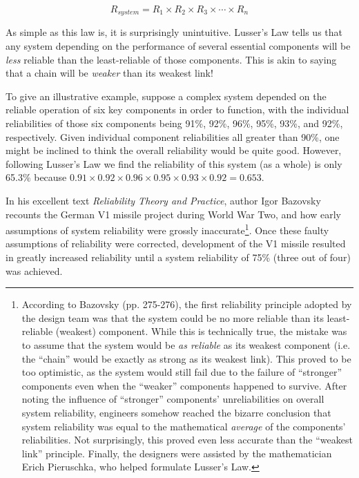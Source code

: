$$R_{system} = R_1 \times R_2 \times R_3 \times \cdots \times R_n$$

As simple as this law is, it is surprisingly unintuitive.  Lusser's Law tells us that any system depending on the performance of several essential components will be \textit{less} reliable than the least-reliable of those components.  This is akin to saying that a chain will be \textit{weaker} than its weakest link!  

To give an illustrative example, suppose a complex system depended on the reliable operation of six key components in order to function, with the individual reliabilities of those six components being 91\%, 92\%, 96\%, 95\%, 93\%, and 92\%, respectively.  Given individual component reliabilities all greater than 90\%, one might be inclined to think the overall reliability would be quite good.  However, following Lusser's Law we find the reliability of this system (as a whole) is only 65.3\% because $0.91 \times 0.92 \times 0.96 \times 0.95 \times 0.93 \times 0.92 = 0.653$.

In his excellent text \textit{Reliability Theory and Practice}, author Igor Bazovsky recounts the German V1 missile project during World War Two, and how early assumptions of system reliability were grossly inaccurate\footnote{According to Bazovsky (pp. 275-276), the first reliability principle adopted by the design team was that the system could be no more reliable than its least-reliable (weakest) component.  While this is technically true, the mistake was to assume that the system would be \textit{as reliable} as its weakest component (i.e. the ``chain'' would be exactly as strong as its weakest link).  This proved to be too optimistic, as the system would still fail due to the failure of ``stronger'' components even when the ``weaker'' components happened to survive.  After noting the influence of ``stronger'' components' unreliabilities on overall system reliability, engineers somehow reached the bizarre conclusion that system reliability was equal to the mathematical \textit{average} of the components' reliabilities.  Not surprisingly, this proved even less accurate than the ``weakest link'' principle.  Finally, the designers were assisted by the mathematician Erich Pieruschka, who helped formulate Lusser's Law.}.  Once these faulty assumptions of reliability were corrected, development of the V1 missile resulted in greatly increased reliability until a system reliability of 75\% (three out of four) was achieved.      







